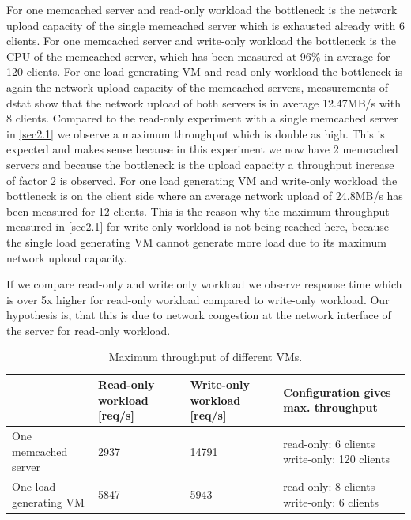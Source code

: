 \documentclass[11pt,a4paper]{article}
\begin{document}
For one memcached server and read-only workload the bottleneck is the network upload capacity of the single memcached server which is exhausted already with 6 clients.
For one memcached server and write-only workload the bottleneck is the CPU of the memcached server, which has been measured at 96\% in average for 120 clients.
For one load generating VM and read-only workload the bottleneck is again the network upload capacity of the memcached servers, measurements of dstat show that the network upload of both servers is in average 12.47MB/s with 8 clients. Compared to the read-only experiment with a single memcached server in \autoref{sec2.1} we observe a maximum throughput which is double as high. This is expected and makes sense because in this experiment we now have 2 memcached servers and because the bottleneck is the upload capacity a throughput increase of factor 2 is observed.
For one load generating VM and write-only workload the bottleneck is on the client side where an average network upload of 24.8MB/s has been measured for 12 clients. This is the reason why the maximum throughput measured in \autoref{sec2.1} for write-only workload is not being reached here, because the single load generating VM cannot generate more load due to its maximum network upload capacity.

If we compare read-only and write only workload we observe response time which is over 5x higher for read-only workload compared to write-only workload. Our hypothesis is, that this is due to network congestion at the network interface of the server for read-only workload.


\begin{center}
\begin{table}
	\begin{tabular}{|l|p{2cm}|p{2cm}|p{7cm}|}
		\hline                        & Read-only workload [req/s] & Write-only workload [req/s] & Configuration gives max. throughput \\ 
		\hline One memcached server   &          2937          &      14791               &            read-only: 6 clients \newline write-only: 120 clients                         \\ 
		\hline One load generating VM &        5847            &          5943           &         read-only: 8 clients \newline write-only: 6 clients                            \\ 
		\hline 
	\end{tabular}
	\caption{Maximum throughput of different VMs.}
	\label{sec2res}
\end{table}
\end{center}
\end{document}
